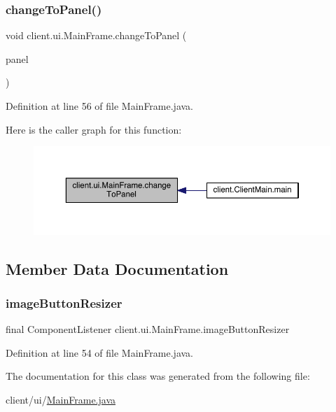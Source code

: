\subsubsection{\texorpdfstring{change\+To\+Panel()}{changeToPanel()}}
{\footnotesize\ttfamily void client.\+ui.\+Main\+Frame.\+change\+To\+Panel (\begin{DoxyParamCaption}\item[{javax.\+swing.\+J\+Component}]{panel }\end{DoxyParamCaption})}



Definition at line 56 of file Main\+Frame.\+java.

Here is the caller graph for this function\+:
\nopagebreak
\begin{figure}[H]
\begin{center}
\leavevmode
\includegraphics[width=350pt]{classclient_1_1ui_1_1_main_frame_ae415687be6f7197dd0d70d65d08d5221_icgraph}
\end{center}
\end{figure}


\subsection{Member Data Documentation}
\hypertarget{classclient_1_1ui_1_1_main_frame_adc5b4f5b4aa376358a04eddef4741233}{}\label{classclient_1_1ui_1_1_main_frame_adc5b4f5b4aa376358a04eddef4741233} 
\subsubsection{\texorpdfstring{image\+Button\+Resizer}{imageButtonResizer}}
{\footnotesize\ttfamily final Component\+Listener client.\+ui.\+Main\+Frame.\+image\+Button\+Resizer}



Definition at line 54 of file Main\+Frame.\+java.



The documentation for this class was generated from the following file\+:\begin{DoxyCompactItemize}
\item 
client/ui/\hyperlink{_main_frame_8java}{Main\+Frame.\+java}\end{DoxyCompactItemize}
